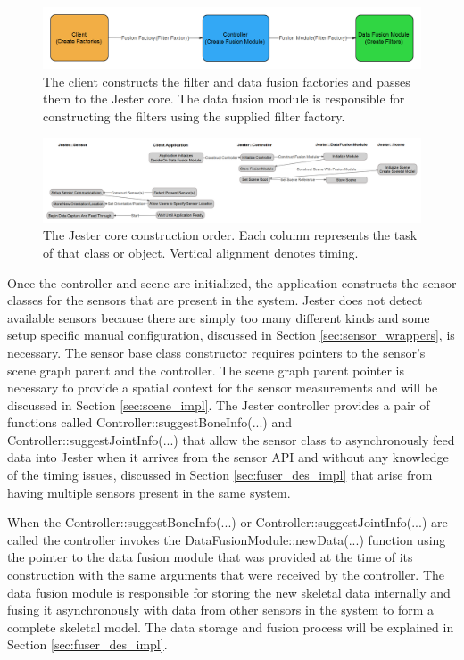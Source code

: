 \begin{figure}[]
\centering
\includegraphics[width=1\textwidth]{figures/factoryDisambig}
\caption{The client constructs the filter and data fusion factories and passes them to the Jester core. The data fusion module is responsible for constructing the filters using the supplied filter factory.}
\label{fig:factory_flow}
\end{figure}

\begin{figure}[]
\centering
\includegraphics[width=1\textwidth]{figures/constructionOrder}
\caption{The Jester core construction order. Each column represents the task of that class or object. Vertical alignment denotes timing.}
\label{fig:const_order}
\end{figure}

Once the controller and scene are initialized, the application constructs the sensor classes for the sensors that are present in the system. Jester does not detect available sensors because there are simply too many different kinds and some setup specific manual configuration, discussed in Section \ref{sec:sensor_wrappers}, is necessary. The sensor base class constructor requires pointers to the sensor's scene graph parent and the controller. The scene graph parent pointer is necessary to provide a spatial context for the sensor measurements and will be discussed in Section \ref{sec:scene_impl}. The Jester controller provides a pair of functions called Controller::suggestBoneInfo(...) and Controller::suggestJointInfo(...) that allow the sensor class to asynchronously feed data into Jester when it arrives from the sensor API and without any knowledge of the timing issues, discussed in Section \ref{sec:fuser_des_impl} that arise from having multiple sensors present in the same system.

When the \mbox{Controller::suggestBoneInfo(...)} or \mbox{Controller::suggestJointInfo(...)} are called the controller invokes the \mbox{DataFusionModule::newData(...)} function using the pointer to the data fusion module that was provided at the time of its construction with the same arguments that were received by the controller. The  data fusion module is responsible for storing the new skeletal data internally and fusing it asynchronously with data from other sensors in the system to form a complete skeletal model. The data storage and fusion process will be explained in Section \ref{sec:fuser_des_impl}.

